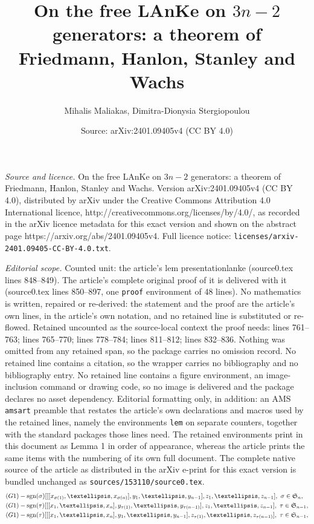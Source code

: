 \documentclass[10pt,a4paper]{amsart}
\title{On the free LAnKe on $3n-2$ generators: a theorem of Friedmann, Hanlon, Stanley and Wachs}
\author{Mihalis Maliakas, Dimitra-Dionysia Stergiopoulou}
\date{Source: arXiv:2401.09405v4 (CC BY 4.0)}
\DeclareMathOperator{\sign}{sgn}
\begin{document}
\maketitle

\noindent\emph{Source and licence.} On the free LAnKe on $3n-2$ generators: a theorem of Friedmann, Hanlon, Stanley and Wachs. Version arXiv:2401.09405v4 (CC BY 4.0), distributed by arXiv under the Creative Commons Attribution 4.0 International licence, http://creativecommons.org/licenses/by/4.0/, as recorded in the arXiv licence metadata for this exact version and shown on the abstract page https://arxiv.org/abs/2401.09405v4. Full licence notice: \texttt{licenses/arxiv-2401.09405-CC-BY-4.0.txt}.\par\smallskip

\noindent\textit{Editorial scope.} Counted unit: the article's lem presentationlanke (source0.tex lines 848--849). The article's complete original proof of it is delivered with it (source0.tex lines 850--897, one \texttt{proof} environment of 48 lines). No mathematics is written, repaired or re-derived: the statement and the proof are the article's own lines, in the article's own notation, and no retained line is substituted or re-flowed.  Retained uncounted as the source-local context the proof needs: lines 761--763; lines 765--770; lines 778--784; lines 811--812; lines 832--836.  Nothing was omitted from any retained span, so the package carries no omission record.  No retained line contains a citation, so the wrapper carries no bibliography and no bibliography entry.  No retained line contains a figure environment, an image-inclusion command or drawing code, so no image is delivered and the package declares no asset dependency.  Editorial formatting only, in addition: an AMS \texttt{amsart} preamble that restates the article's own declarations and macros used by the retained lines, namely the environments \texttt{lem} on separate counters, together with the standard packages those lines need.  The retained environments print in this document as Lemma 1 in order of appearance, whereas the article prints the same items with the numbering of its own full document.  The complete native source of the article as distributed in the arXiv e-print for this exact version is bundled unchanged as \texttt{sources/153110/source0.tex}.
	\begin{align}
		\label{51}\textup{(G1)}&- \sign(\sigma)[[[{x_{\sigma(1)}},\dots ,{x_{\sigma(n)}} ],{y_{1}},\dots, y_{n-1}], z_{1},\dots ,z_{n-1}], \ \sigma \in \mathfrak{S}_n, \\\label{52}\textup{(G1)}&-\sign(\tau)[[[{x_{1}},\dots ,{x_{n}} ],{y_{\tau(1)}},\dots, y_{\tau(n-1)}], z_{1},\dots ,z_{n-1}], \ \tau \in \mathfrak{S}_{n-1},\\\label{53}\textup{(G1)}&-\sign(\tau)[[[{x_{1}},\dots ,{x_{n}} ],{y_{1}},\dots, y_{n-1}], z_{\tau(1)},\dots ,z_{\tau(n-1)}], \ \tau \in \mathfrak{S}_{n-1},
	\end{align}
\end{document}
